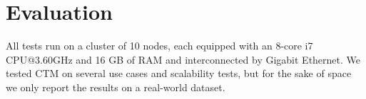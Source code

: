 \documentclass[
]{ceurart}
\renewcommand{\sf}[1]{\textsf{\textup{#1}}}
\newcommand{\mf}[1]{#1}
\begin{document}
\section{Evaluation}\label{sec:test}
All tests run on a cluster of 10 nodes, each equipped with an 8-core i7 CPU@3.60GHz and 16 GB of RAM and interconnected by Gigabit Ethernet.
We tested CTM on several use cases and scalability tests, but for the sake of space we only report the results on a real-world dataset.%
\end{document}

